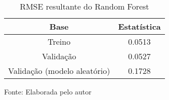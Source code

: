 
\begin{table}[h]
\centering
\caption{RMSE resultante do Random Forest}
\label{tab:cap3_rmse_random_forest}
\begin{tabular}{cc}
Base & Estatística \\
\hline
Treino & 0.0513 \\
Validação & 0.0527 \\
Validação (modelo aleatório) & 0.1728 \\
\hline
\end{tabular}

Fonte: Elaborada pelo autor
\end{table}
